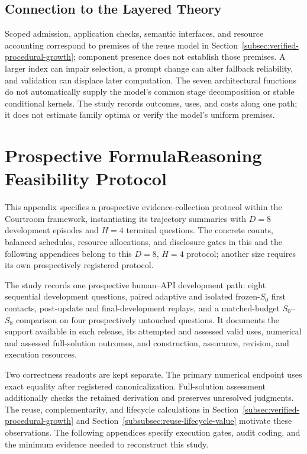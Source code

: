 \documentclass[10pt]{article} %
\providecommand{\1}{\mathbf{1}}  %
\theoremstyle{remark}
\theoremstyle{definition}
\begin{document}
\subsection{Connection to the Layered Theory}
\label{subsec:courtroom-theory}

Scoped admission, application checks, semantic interfaces, and resource
accounting correspond to premises of the reuse model in
Section~\ref{subsec:verified-procedural-growth}; component presence does
not establish those premises. A larger index can impair selection,
a prompt change can alter fallback reliability, and validation can
displace later computation. The seven architectural functions do not
automatically supply the model's common stage decomposition or stable
conditional kernels. The study records outcomes, uses, and costs along
one path; it does not estimate family optima or verify the model's uniform
premises.




\appendix

\section{Prospective FormulaReasoning Feasibility Protocol}

\label{sec:pilot-design}

This appendix specifies a prospective evidence-collection protocol within
the Courtroom framework, instantiating its trajectory summaries with $D=8$
development episodes and $H=4$ terminal questions. The concrete counts,
balanced schedules, resource allocations, and disclosure gates in this and the following
appendices belong to this $D=8$, $H=4$ protocol; another size requires its
own prospectively registered protocol.

The study records one prospective human--API development path: eight
sequential development questions, paired adaptive and isolated frozen-$S_0$
first contacts, post-update and final-development replays, and a matched-budget
$S_0$--$S_8$ comparison on four prospectively untouched questions. It
documents the support available in each release, its attempted and assessed
valid uses, numerical and assessed full-solution outcomes, and construction,
assurance, revision, and execution resources.

Two correctness readouts are kept separate. The primary numerical endpoint
uses exact equality after registered canonicalization. Full-solution
assessment additionally checks the retained derivation and preserves
unresolved judgments. The reuse, complementarity, and lifecycle calculations
in Section~\ref{subsec:verified-procedural-growth} and
Section~\ref{subsubsec:reuse-lifecycle-value} motivate these observations.
The following appendices specify execution gates, audit coding, and the
minimum evidence needed to reconstruct this study.
\end{document}
